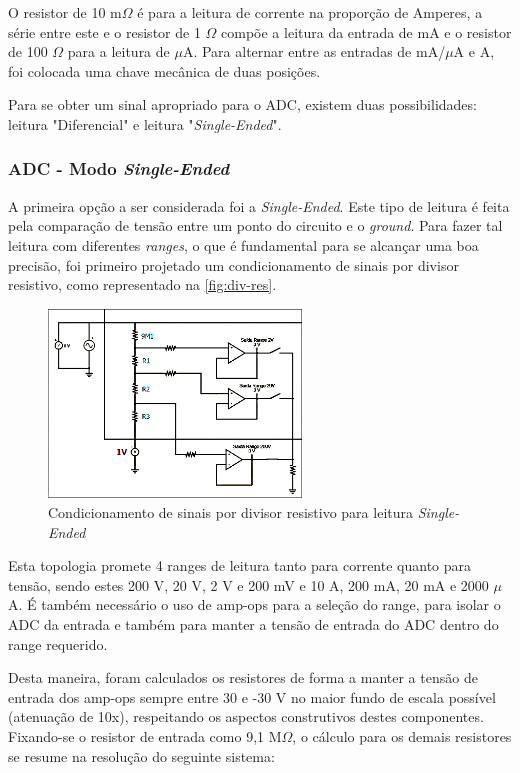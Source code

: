 O resistor de 10 m$\Omega$ é para a leitura de corrente na proporção de Amperes, a série entre este e o resistor de 1 $\Omega$ compõe a leitura da entrada de mA e o resistor de 100 $\Omega$ para a leitura de $\mu$A. Para alternar entre as entradas de mA/$\mu$A e A, foi colocada uma chave mecânica de duas posições.

Para se obter um sinal apropriado para o ADC, existem duas possibilidades: leitura "Diferencial" e leitura "\textit{Single-Ended}".

\subsubsection{ADC - Modo \textit{Single-Ended}}\label{single-ended}

A primeira opção a ser considerada foi a \textit{Single-Ended}. Este tipo de leitura é feita pela comparação de tensão entre um ponto do circuito e o \textit{ground}. Para fazer tal leitura com diferentes \textit{ranges}, o que é fundamental para se alcançar uma boa precisão, foi primeiro projetado um condicionamento de sinais por divisor resistivo, como representado na \autoref{fig:div-res}.

\begin{figure}[htb!]
    \caption{Condicionamento de sinais por divisor resistivo para leitura \textit{Single-Ended}}
    \label{fig:div-res}
    \includegraphics[width=0.6\textwidth]{figuras/div-res.png}
    \fonte{}
\end{figure}

Esta topologia promete 4 ranges de leitura tanto para corrente quanto para tensão, sendo estes 200 V, 20 V, 2 V e 200 mV e 10 A, 200 mA, 20 mA e 2000 $\mu$A. É também necessário o uso de \gls{amp-op}s para a seleção do range, para isolar o \gls{ADC} da entrada e também para manter a tensão de entrada do \gls{ADC} dentro do range requerido.

Desta maneira, foram calculados os resistores de forma a manter a tensão de entrada dos \gls{amp-op}s sempre entre 30 e -30 V no maior fundo de escala possível (atenuação de 10x), respeitando os aspectos construtivos destes componentes. Fixando-se o resistor de entrada como 9,1 M$\Omega$, o cálculo para os demais resistores se resume na resolução do seguinte sistema:

